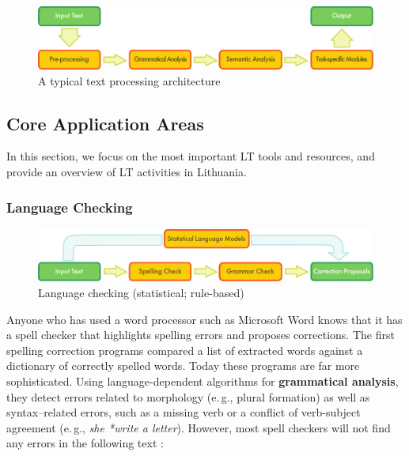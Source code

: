 \begin{multicols}{2}
\begin{figure}[htb]
  \center
  \includegraphics[width=\textwidth]{../_media/english/text_processing_app_architecture}
  \caption{A typical text processing architecture}
\label{fig:textprocessingarch_en}
\end{figure}

\subsection{Core Application Areas}

In this section, we focus on the most important LT tools and resources, and provide an overview of LT activities in Lithuania. 

\subsubsection{Language Checking}

\begin{figure}[hb]
  \center
  \includegraphics[width=\textwidth]{../_media/english/language_checking}
  \caption{Language checking (statistical; rule-based)}
\label{fig:langcheckingaarch_en}
\end{figure}

Anyone who has used a word processor such as Microsoft Word knows that it has a spell checker that highlights spelling errors and proposes corrections. The first spelling correction programs compared a list of extracted words against a dictionary of correctly spelled words. Today these programs are far more sophisticated. Using language-dependent algorithms for \textbf{grammatical analysis}, they detect errors related to morphology (e.\,g., plural formation) as well as syntax–related errors, such as a missing verb or a conflict of verb-subject agreement (e.\,g., \textit{she *write a letter}). However, most spell checkers will not find any errors in the following text \cite{zar1}:


\end{multicols}
